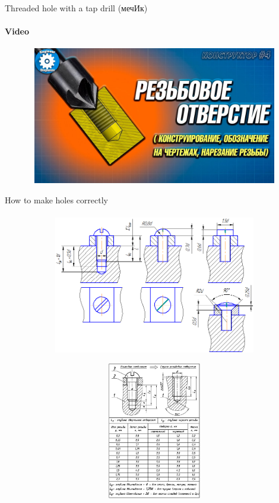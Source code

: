 \documentclass[aspectratio=169]{beamer}
\begin{document}
\begin{frame}[t]{Threaded hole with a tap drill (мечИк)}
    \framesubtitle{Video}
    \vspace{-0.6cm}
    \begin{figure}[H]
        \href{https://youtu.be/PTlRTipSVNk?t=31}{
            \centering\includegraphics[height=6cm,width=1\textwidth,keepaspectratio]{threaded_hole_video.jpg}}
        \label{fig:threaded_hole_video.jpg}
    \end{figure}
\end{frame}

\begin{frame}[t]{How to make holes correctly}
    \framesubtitle{}
    \vspace{-0.6cm}
    \begin{figure}[H]
        \begin{subfigure}{0.59\textwidth}
            \centering\includegraphics[height=6cm,width=1\textwidth,keepaspectratio]{vint_soed_2.png}
            \label{fig:vint_soed_2.png}
        \end{subfigure}
        \begin{subfigure}{0.39\textwidth}
            \centering\includegraphics[height=6cm,width=1\textwidth,keepaspectratio]{gluh_thread.jpg}
            \label{fig:gluh_thread.jpg}
        \end{subfigure}
    \end{figure}
\end{frame}
\end{document}
